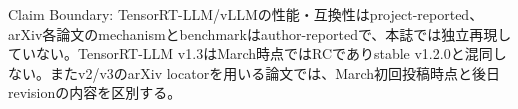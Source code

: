 \begin{claimboundary}
Claim Boundary: TensorRT-LLM/vLLMの性能・互換性はproject-reported、arXiv各論文のmechanismとbenchmarkはauthor-reportedで、本誌では独立再現していない。TensorRT-LLM v1.3はMarch時点ではRCでありstable v1.2.0と混同しない。またv2/v3のarXiv locatorを用いる論文では、March初回投稿時点と後日revisionの内容を区別する。\autocite{src-361b6111931d,src-3802d01433c1,src-446e2c561111,src-795aff00bd48,src-7e670bf82538,src-b08e40540c2a,src-b6e517afaa35,src-d6cda62f02bb,src-fc697f165940}
\end{claimboundary}

